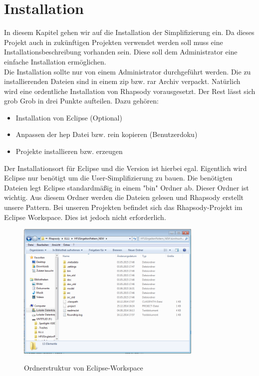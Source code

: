 \chapter{Installation}
In diesem Kapitel gehen wir auf die Installation der Simplifizierung ein. Da
dieses Projekt auch in zukünftigen Projekten verwendet werden soll muss eine
Installationsbeschreibung vorhanden sein. Diese soll dem Administrator eine
einfache Installation ermöglichen.\\
Die Installation sollte nur von einem Administrator durchgeführt werden. 
Die zu installierenden Dateien sind in einem zip bzw. rar Archiv verpackt. 
Natürlich wird eine ordentliche Installation von Rhapsody vorausgesetzt. Der
Rest lässt sich grob Grob in drei Punkte aufteilen.
Dazu gehören:
\begin{itemize}
  \item Installation von Eclipse (Optional)
  \item Anpassen der hep Datei bzw. rein kopieren (Benutzerdoku)
  \item Projekte installieren bzw. erzeugen
\end{itemize}
Der Installationsort für Eclipse und die Version ist hierbei egal. Eigentlich
wird Eclipse nur benötigt um die User-Simplifizierung zu bauen. Die benötigten
Dateien legt Eclipse standardmäßig in einem "bin" Ordner ab. Dieser Ordner ist
wichtig. Aus diesem Ordner werden die Dateien gelesen und Rhapsody erstellt
unsere Pattern. Bei unseren Projekten befindet sich das Rhapsody-Projekt im
Eclipse Workspace. Dies ist jedoch nicht erforderlich. 
\begin{figure}[H]
	\centering
	\includegraphics[width=0.79\textwidth]{content/pictures/install/struktur.png}
	\label{pic:bild}
	\caption{Ordnerstruktur von Eclipse-Workspace}
\end{figure}
